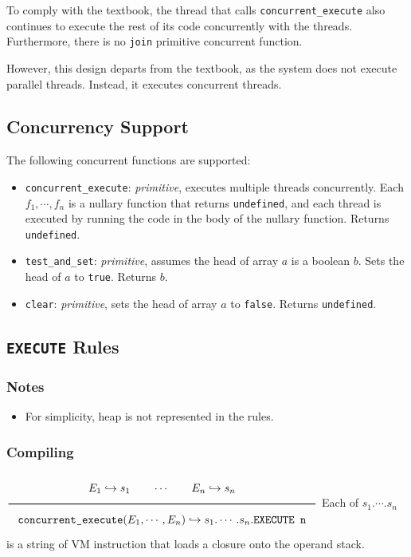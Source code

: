 To comply with the textbook, the thread that calls \texttt{concurrent\_execute} also continues to execute the rest of its code concurrently with the threads. Furthermore, there is no \texttt{join} primitive concurrent function.

However, this design departs from the textbook, as the system does not execute parallel threads. Instead, it executes concurrent threads.

\subsection{Concurrency Support}
\label{sec:orgaa84fb2}
The following concurrent functions are supported:
\begin{itemize}
\item \texttt{concurrent\_execute}: \textit{primitive}, executes multiple threads concurrently. Each \(f_1, \cdots ,f_n\) is a nullary function that returns \texttt{undefined}, and each thread is executed by running the code in the body of the nullary function. Returns \texttt{undefined}.
\item \texttt{test\_and\_set}: \textit{primitive}, assumes the head of array \(a\) is a boolean \(b\). Sets the head of \(a\) to \texttt{true}. Returns \(b\).
\item \texttt{clear}: \textit{primitive}, sets the head of array \(a\) to \texttt{false}. Returns \texttt{undefined}.
\end{itemize}

\subsection{\texttt{EXECUTE} Rules}
\label{sec:org9d11a1b}

\subsubsection{Notes}
\label{sec:org7100746}
\begin{itemize}
\item For simplicity, heap is not represented in the rules.
\end{itemize}

\subsubsection{Compiling}
\label{sec:orgbdcf42b}
\(\Rule{E_1 \translateaux s_1 \qquad \cdots \qquad E_n \translateaux s_n}{\texttt{concurrent\_execute}(E_1, \cdots , E_n) \translateaux s_1. \cdots .s_n.\texttt{EXECUTE n}}\\\)
Each of \(s_1. \cdots .s_n\) is a string of VM instruction that loads a closure onto the operand stack.

